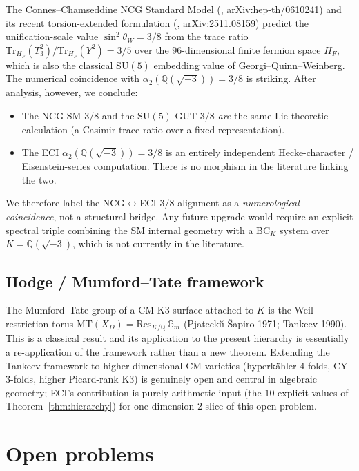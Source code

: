 \documentclass[12pt]{amsart}
\theoremstyle{definition}
\newcommand{\Q}{\mathbb{Q}}
\begin{document}
The Connes--Chamseddine NCG Standard Model
(\cite{ChamseddineConnesMarcolli2007}, arXiv:hep-th/0610241) and its
recent torsion-extended formulation
(\cite{DabrowskiMukhopadhyayPozar2025}, arXiv:2511.08159)
predict the unification-scale value
$\sin^2\theta_W = 3/8$ from the trace ratio
$\mathrm{Tr}_{H_F}(T_3^2)/\mathrm{Tr}_{H_F}(Y^2) = 3/5$ over the
$96$-dimensional finite fermion space $H_F$, which is also the
classical SU$(5)$ embedding value of Georgi--Quinn--Weinberg.
The numerical coincidence with $\alpha_2(\Q(\sqrt{-3})) = 3/8$ is
striking. After analysis, however, we conclude:
\begin{itemize}[leftmargin=2em]
  \item The NCG SM $3/8$ and the SU$(5)$ GUT $3/8$ \emph{are} the same
        Lie-theoretic calculation (a Casimir trace ratio over a fixed
        representation).
  \item The ECI $\alpha_2(\Q(\sqrt{-3})) = 3/8$ is an entirely independent
        Hecke-character / Eisenstein-series computation. There is no
        morphism in the literature linking the two.
\end{itemize}
We therefore label the NCG$\leftrightarrow$ECI $3/8$ alignment as a
\emph{numerological coincidence}, not a structural bridge. Any future
upgrade would require an explicit spectral triple combining the SM
internal geometry with a BC$_K$ system over $K = \Q(\sqrt{-3})$,
which is not currently in the literature.

\subsection{Hodge / Mumford--Tate framework}

The Mumford--Tate group of a CM K3 surface attached to $K$ is the
Weil restriction torus
$\mathrm{MT}(X_D) = \mathrm{Res}_{K/\Q}\,\mathbb{G}_m$
(Pjatecki\u{\i}-\v{S}apiro 1971; Tankeev 1990). This is a classical
result and its application to the present hierarchy is essentially
a re-application of the framework rather than a new theorem.
Extending the Tankeev framework to higher-dimensional CM varieties
(hyperk\"ahler $4$-folds, CY $3$-folds, higher Picard-rank K3) is
genuinely open and central in algebraic geometry; ECI's contribution
is purely arithmetic input (the $10$ explicit values of
Theorem~\ref{thm:hierarchy}) for one dimension-$2$ slice of this open
problem.

\section{Open problems}
\label{sec:open}
\end{document}
